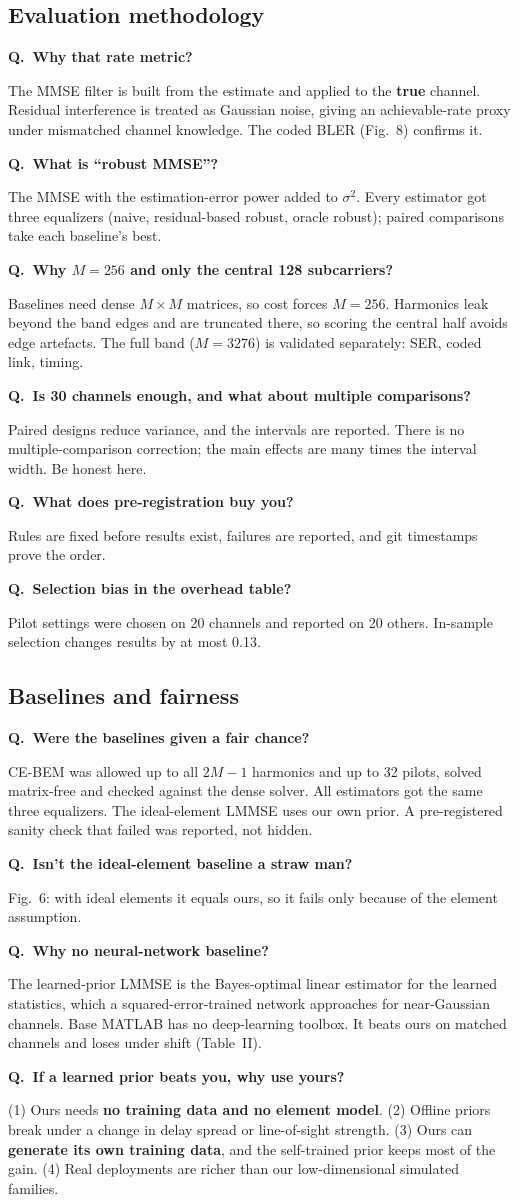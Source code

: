 \documentclass[11pt,a4paper]{article}
\newcounter{qn}
\newcommand{\Q}[1]{\stepcounter{qn}\par\medskip\noindent\textbf{Q\theqn.\ #1}\par\nopagebreak\noindent}
\begin{document}
\subsection{Evaluation methodology}
\Q{Why that rate metric?}
The MMSE filter is built from the estimate and applied to the \textbf{true} channel. Residual interference is treated as
Gaussian noise, giving an achievable-rate proxy under mismatched channel knowledge. The coded BLER (Fig.~8) confirms it.
\Q{What is ``robust MMSE''?}
The MMSE with the estimation-error power added to $\sigma^2$. Every estimator got three equalizers (naive, residual-based
robust, oracle robust); paired comparisons take each baseline's best.
\Q{Why $M=256$ and only the central 128 subcarriers?}
Baselines need dense $M\times M$ matrices, so cost forces $M=256$. Harmonics leak beyond the band edges and are truncated
there, so scoring the central half avoids edge artefacts. The full band ($M=3276$) is validated separately: SER, coded link,
timing.
\Q{Is 30 channels enough, and what about multiple comparisons?}
Paired designs reduce variance, and the intervals are reported. There is no multiple-comparison correction; the main effects
are many times the interval width. Be honest here.
\Q{What does pre-registration buy you?}
Rules are fixed before results exist, failures are reported, and git timestamps prove the order.
\Q{Selection bias in the overhead table?}
Pilot settings were chosen on 20 channels and reported on 20 others. In-sample selection changes results by at most 0.13.

\subsection{Baselines and fairness}
\Q{Were the baselines given a fair chance?}
CE-BEM was allowed up to all $2M-1$ harmonics and up to 32 pilots, solved matrix-free and checked against the dense solver.
All estimators got the same three equalizers. The ideal-element LMMSE uses our own prior. A pre-registered sanity check that
failed was reported, not hidden.
\Q{Isn't the ideal-element baseline a straw man?}
Fig.~6: with ideal elements it equals ours, so it fails only because of the element assumption.
\Q{Why no neural-network baseline?}
The learned-prior LMMSE is the Bayes-optimal linear estimator for the learned statistics, which a squared-error-trained
network approaches for near-Gaussian channels. Base MATLAB has no deep-learning toolbox. It beats ours on matched channels
and loses under shift (Table~II).
\Q{If a learned prior beats you, why use yours?}
(1) Ours needs \textbf{no training data and no element model}. (2) Offline priors break under a change in delay spread or
line-of-sight strength. (3) Ours can \textbf{generate its own training data}, and the self-trained prior keeps most of the
gain. (4) Real deployments are richer than our low-dimensional simulated families.
\end{document}
